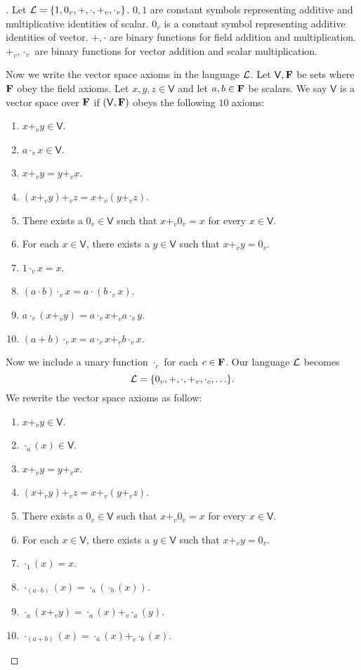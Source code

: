 \begin{proof}[]
  Let \(\mathcal{L} = \left\lbrace1, 0_v, +, \cdot, +_v, \cdot_v\right\rbrace\).
  \(0, 1\) are constant symbols representing additive and multiplicative identities of scalar.
  \(0_v\) is a constant symbol representing additive identities of vector.
  \(+, \cdot\) are binary functions for field addition and multiplication.
  \(+_v, \cdot_v\) are binary functions for vector addition and scalar multiplication.

  Now we write the vector space axioms in the language \(\mathcal{L}\).
  Let \(\mathsf{V}, \mathbf{F}\) be sets where \(\mathbf{F}\) obey the field axioms.
  Let \(x, y, z \in \mathsf{V}\) and let \(a, b \in \mathbf{F}\) be scalars.
  We say \(\mathsf{V}\) is a vector space over \(\mathbf{F}\) if \((\mathsf{V}, \mathbf{F})\) obeys the following \(10\) axioms:
  \begin{enumerate}
    \item \(x +_v y \in \mathsf{V}\).
    \item \(a \cdot_v x \in \mathsf{V}\).
    \item \(x +_v y = y +_v x\).
    \item \((x +_v y) +_v z = x +_v (y +_v z)\).
    \item There exists a \(0_v \in \mathsf{V}\) such that \(x +_v 0_v = x\) for every \(x \in \mathsf{V}\).
    \item For each \(x \in \mathsf{V}\), there exists a \(y \in \mathsf{V}\) such that \(x +_v y = 0_v\).
    \item \(1 \cdot_v x = x\).
    \item \((a \cdot b) \cdot_v x = a \cdot (b \cdot_v x)\).
    \item \(a \cdot_v (x +_v y) = a \cdot_v x +_v a \cdot_v y\).
    \item \((a + b) \cdot_v x = a \cdot_v x +_v b \cdot_v x\).
  \end{enumerate}

  Now we include a unary function \(\cdot_c\) for each \(c \in \mathbf{F}\).
  Our language \(\mathcal{L}\) becomes
  \[
    \Lc = \set{0_v, +, \cdot, +_v, \cdot_c, \dots}.
  \]
  We rewrite the vector space axioms as follow:
  \begin{enumerate}
    \item \(x +_v y \in \mathsf{V}\).
    \item \(\cdot_a(x) \in \mathsf{V}\).
    \item \(x +_v y = y +_v x\).
    \item \((x +_v y) +_v z = x +_v (y +_v z)\).
    \item There exists a \(0_v \in \mathsf{V}\) such that \(x +_v 0_v = x\) for every \(x \in \mathsf{V}\).
    \item For each \(x \in \mathsf{V}\), there exists a \(y \in \mathsf{V}\) such that \(x +_v y = 0_v\).
    \item \(\cdot_1(x) = x\).
    \item \(\cdot_{(a \cdot b)}(x) = \cdot_a(\cdot_b(x))\).
    \item \(\cdot_a(x +_v y) = \cdot_a(x) +_v \cdot_a(y)\).
    \item \(\cdot_{(a + b)}(x) = \cdot_a(x) +_v \cdot_b(x)\).
  \end{enumerate}
\end{proof}


